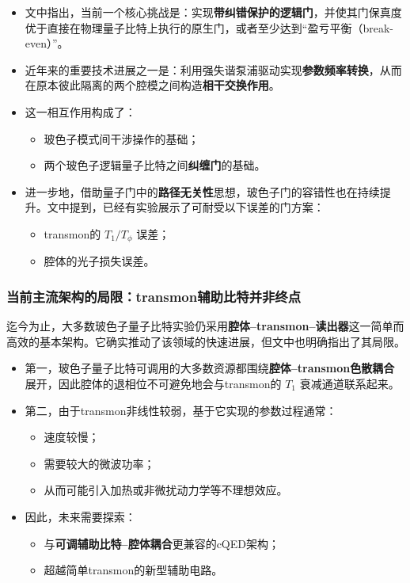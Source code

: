 \documentclass[12pt,a4paper,oneside]{ctexbook}
\begin{document}
\begin{itemize}
    \item 文中指出，当前一个核心挑战是：实现\textbf{带纠错保护的逻辑门}，并使其门保真度优于直接在物理量子比特上执行的原生门，或者至少达到“盈亏平衡（break-even）”。
    
    \item 近年来的重要技术进展之一是：利用强失谐泵浦驱动实现\textbf{参数频率转换}，从而在原本彼此隔离的两个腔模之间构造\textbf{相干交换作用}。
    
    \item 这一相互作用构成了：
    \begin{itemize}
        \item 玻色子模式间干涉操作的基础；
        \item 两个玻色子逻辑量子比特之间\textbf{纠缠门}的基础。
    \end{itemize}
    
    \item 进一步地，借助量子门中的\textbf{路径无关性}思想，玻色子门的容错性也在持续提升。文中提到，已经有实验展示了可耐受以下误差的门方案：
    \begin{itemize}
        \item transmon的 \(T_1/T_\phi\) 误差；
        \item 腔体的光子损失误差。
    \end{itemize}
\end{itemize}

\subsubsection{当前主流架构的局限：transmon辅助比特并非终点}

迄今为止，大多数玻色子量子比特实验仍采用\textbf{腔体--transmon--读出器}这一简单而高效的基本架构。它确实推动了该领域的快速进展，但文中也明确指出了其局限。

\begin{itemize}
    \item 第一，玻色子量子比特可调用的大多数资源都围绕\textbf{腔体--transmon色散耦合}展开，因此腔体的退相位不可避免地会与transmon的 \(T_1\) 衰减通道联系起来。
    
    \item 第二，由于transmon非线性较弱，基于它实现的参数过程通常：
    \begin{itemize}
        \item 速度较慢；
        \item 需要较大的微波功率；
        \item 从而可能引入加热或非微扰动力学等不理想效应。
    \end{itemize}
    
    \item 因此，未来需要探索：
    \begin{itemize}
        \item 与\textbf{可调辅助比特--腔体耦合}更兼容的cQED架构；
        \item 超越简单transmon的新型辅助电路。
    \end{itemize}
\end{itemize}
\end{document}
